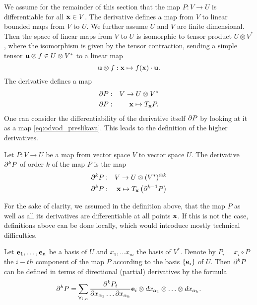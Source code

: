 We assume for the remainder of this section that the map $P:V\to U$ is
differentiable for all $\mathbf{x}\in V$. The derivative defines a map from $V$ to
linear bounded maps from $V$ to $U$. We further assume $U$ and $V$ are finite
dimensional. Then the space of linear maps from $V$ to $U$ is isomorphic to
tensor product $U\otimes V^*$, where the isomorphism is given by the
tensor contraction, sending a simple tensor $\mathbf{u}\otimes f\in U\otimes
V^*$ to a linear map
 \begin{equation}
   \label{eq:lin_tenzor}
   \mathbf{u}\otimes f:\mathbf{x} \mapsto f(\mathbf{x})\cdot \mathbf{u}.
 \end{equation}
The derivative defines a map
\begin{eqnarray}
  \label{eq:odvod_preslikava}
  \partial P&:& V\to U\otimes V^*\\
  \partial P&:& \mathbf{x} \mapsto T_{\mathbf{x}} P.
\end{eqnarray}
One can consider the differentiability of the derivative itself $\partial P$ by
looking at it as a map \eqref{eq:odvod_preslikava}. This leads to the definition
of the higher derivatives.
\begin{definition}
  \label{def:higher_derivatives}
  Let $P:V\to U$ be a map from vector space $V$ to vector space $U$. 
The derivative $\partial^k P$ of order $k$ of the map $P$ is the map
\begin{eqnarray}\label{eq:partial}
    \label{eq:visji_odvod}
    \partial^kP&:&V\to U\otimes (V^*)^{\otimes k}\\
    \partial^kP&:&\mathbf{x}\mapsto T_{\mathbf{x}}\left( \partial^{k-1}P \right)
  \end{eqnarray}
\end{definition} 
\begin{remark}
  For the sake of clarity, we assumed in the definition above, that the map $P$
  as well as all its derivatives are differentiable at all points $\mathbf{x}$. If this
  is not the case, 
  definitions above can be done locally, which would introduce mostly technical
  difficulties. 
\end{remark}
Let $\mathbf{e}_1,\ldots,\mathbf{e}_n$ be a basis of $U$ and $x_1,\ldots x_m$ the basis of
$V^*$. Denote by $P_i=x_i\circ P$ the $i-th$ component of the map
$P$ according to the basis $\{\mathbf{e}_i\}$ of $U$.
Then $\partial^kP$  can be defined in terms of
directional (partial) derivatives by the formula
\begin{equation}\label{eq:d}
  \partial^kP=\sum_{\forall_{i,\alpha}}\frac{\partial^k P_i}{\partial
      x_{\alpha_1}\ldots \partial x_{\alpha_k}}\mathbf{e}_i\otimes
    dx_{\alpha_1}\otimes\ldots \otimes dx_{\alpha_k}.
\end{equation}

\printbibliography

